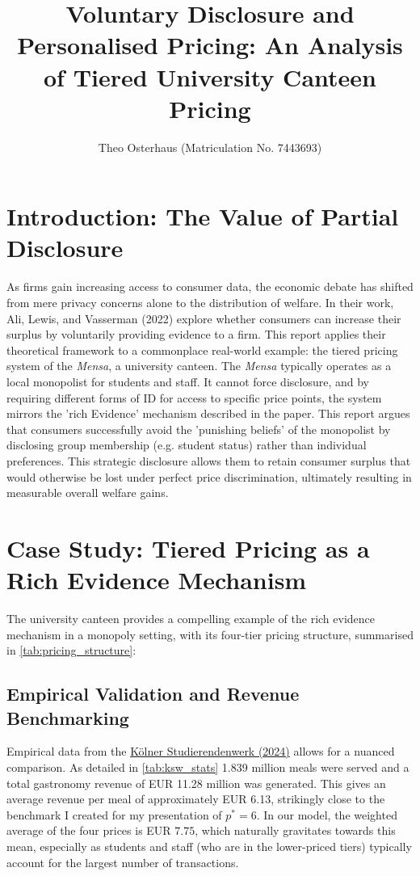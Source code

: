 \documentclass[12pt, a4paper]{article}
\title{\normalsize \vspace{-3cm}\textbf{Voluntary Disclosure and Personalised Pricing: An Analysis of Tiered University Canteen Pricing}}
\author{\small Theo Osterhaus (Matriculation No. 7443693)}
\date{\vspace{-7ex}}
\begin{document}
\maketitle

\section{Introduction: The Value of Partial Disclosure}
As firms gain increasing access to consumer data, the economic debate has shifted from mere privacy concerns alone to the distribution of welfare. In their work, Ali, Lewis, and Vasserman (2022) explore whether consumers can increase their surplus by voluntarily providing evidence to a firm. This report applies their theoretical framework to a commonplace real-world example: the tiered pricing system of the \textit{Mensa}, a university canteen.
The \textit{Mensa} typically operates as a local monopolist for students and staff. It cannot force disclosure, and by requiring different forms of ID for access to specific price points, the system mirrors the 'rich Evidence' mechanism described in the paper. This report argues that consumers successfully avoid the 'punishing beliefs' of the monopolist by disclosing group membership (e.g. student status) rather than individual preferences. This strategic disclosure allows them to retain consumer surplus that would otherwise be lost under perfect price discrimination, ultimately resulting in measurable overall welfare gains.


\section{Case Study: Tiered Pricing as a Rich Evidence Mechanism}
The university canteen provides a compelling example of the rich evidence mechanism in a monopoly setting, with its four-tier pricing structure, summarised in \cref{tab:pricing_structure}:

\subsection{Empirical Validation and Revenue Benchmarking}
Empirical data from the \href{https://gb.kstw.de/2024/kennzahlen/}{Kölner Studierendenwerk (2024)} allows for a nuanced comparison. As detailed in \cref{tab:ksw_stats} 1.839 million meals were served and a total gastronomy revenue of EUR 11.28 million was generated. This gives an average revenue per meal of approximately EUR 6.13, strikingly close to the benchmark I created for my presentation of $p^*=6$. 
In our model, the weighted average of the four prices is EUR $7.75$, which naturally gravitates towards this mean, especially as students and staff (who are in the lower-priced tiers) typically account for the largest number of transactions.
\end{document}
